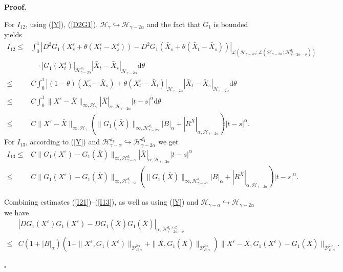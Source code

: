 \documentclass[10pt,a4paper]{article}
\numberwithin{equation}{section}
\newenvironment{proof}[1][\normalfont\bfseries Proof]{%
	\noindent #1.\hspace{0.5em}%
	\ignorespaces%
}{%
	\hfill $\square$%
	\par%
}
\begin{document}
\begin{proof}
	For $I_{12}$, using (\ref{Y}), (\ref{D2G1}), $\mathcal H_{\gamma} \hookrightarrow \mathcal H_{\gamma-2\alpha}$ and the fact that $G_1$ is bounded yields
	\begin{align}\label{I12}
		I_{12} \leq & \int_0^1 |D^2 G_1 (X_s^\varepsilon+\theta(X_t^\varepsilon-X_s^\varepsilon))-D^2 G_1(\bar{X}_s+\theta(\bar{X}_t-\bar{X}_s))|_{\mathcal L (\mathcal H_{\gamma-2\alpha}; \mathcal L (\mathcal H_{\gamma-2\alpha}; \mathcal H_{\gamma-2\alpha-\sigma}^{d_1}))} \nonumber\\
		&~~~~ \cdot
		|G_1(X_t^\varepsilon)|_{\mathcal H_{\gamma-2\alpha}^{d_1}} |\bar{X}_t-\bar{X}_s|_{\mathcal H_{\gamma-2\alpha}} \mathrm{d} \theta \nonumber\\
		\leq & C \int_0^1 |(1-\theta)(X_s^\varepsilon-\bar{X}_s)+\theta (X_t^\varepsilon-\bar{X}_t)|_{\mathcal H_{\gamma-2\alpha}}   |\bar{X}_t-\bar{X}_s|_{\mathcal H_{\gamma-2\alpha}} \mathrm{d} \theta \nonumber\\
		\leq & C \int_0^1  \|X^\varepsilon-\bar{X}\|_{\infty, \mathcal H_\gamma}
		|\bar{X}|_{\alpha, \mathcal H_{\gamma-2\alpha}} |t-s|^\alpha \mathrm{d} \theta  \nonumber\\
		\leq & C \|X^\varepsilon-\bar{X}\|_{\infty, \mathcal H_\gamma} (\|G_1(\bar{X})\|_{\infty,\mathcal H_{\gamma-2\alpha}^{d_1}}|B|_\alpha+|R^{\bar{X}} |_{\alpha, \mathcal H_{\gamma-2\alpha}})  |t-s|^\alpha  .
	\end{align}	
	For $I_{13}$, according to (\ref{Y}) and $\mathcal H_{\gamma-\alpha}^{d_1} \hookrightarrow \mathcal H_{\gamma-2\alpha}^{d_1}$ we get
	\begin{align}\label{I13}
		I_{13}	
		\leq & C \|G_1(X^\varepsilon)-G_1(\bar{X})\|_{\infty,\mathcal H_{\gamma-\alpha}^{d_1}} |\bar{X}|_{\alpha,\mathcal H_{\gamma-2\alpha}} |t-s|^\alpha \nonumber\\
		\leq & C \|G_1(X^\varepsilon)-G_1(\bar{X})\|_{\infty,\mathcal H_{\gamma-\alpha}^ {d_1}} (\|G_1(\bar{X})\|_{\infty,\mathcal H_{\gamma-2\alpha}^{d_1}}|B|_\alpha+|R^{\bar{X}} |_{\alpha, \mathcal H_{\gamma-2\alpha}})  |t-s|^\alpha  .
	\end{align}
	
	
	Combining estimates (\ref{I21})--(\ref{I13}), as well as using (\ref{Y}) and $\mathcal H_{\gamma-\alpha} \hookrightarrow \mathcal H_{\gamma-2\alpha}$ we have
	\begin{align}\label{G3}
		&|DG_1(X^\varepsilon)G_1(X^\varepsilon)-DG_1(\bar{X})G_1(\bar{X})|_{\alpha, \mathcal H_{\gamma-2\alpha-\sigma}^{d_1 \times d_1}}  \nonumber\\
		\leq & C(1+|B|_\alpha) \left(1+\|X^\varepsilon,G_1(X^\varepsilon)\|_{\mathcal{D}_{ B,\gamma}^{2\alpha}} +\|\bar{X},G_1(\bar{X})\|_{\mathcal{D}_{ B,\gamma}^{2\alpha}} \right) \|X^\varepsilon-\bar{X},G_1(X^\varepsilon)-G_1(\bar{X})\|_{\mathcal{D}_{ B,\gamma}^{2\alpha}}  .
	\end{align}
	

\end{proof}
\end{document}
